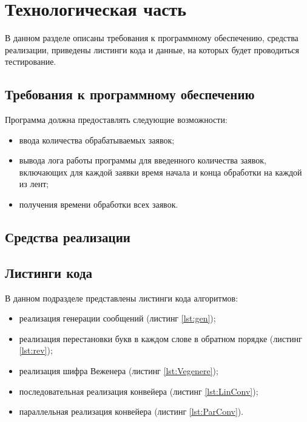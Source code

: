 \chapter{Технологическая часть}

В данном разделе описаны требования к программному обеспечению, средства
реализации, приведены листинги кода и данные, на которых будет проводиться
тестирование.

\section{Требования к программному обеспечению}

Программа должна предоставлять следующие возможности:
\begin{itemize}[left=\parindent]
    \item ввода количества обрабатываемых заявок;
    \item вывода лога работы программы для введенного количества заявок,
        включающих для каждой заявки время начала и конца обработки на каждой
        из лент;
    \item получения времени обработки всех заявок.
\end{itemize}

\section{Средства реализации}


\newpage
\section{Листинги кода}

В данном подразделе представлены листинги кода алгоритмов:
\begin{itemize}[]
    \item реализация генерации сообщений (листинг \ref{lst:gen});
    \item реализация перестановки букв в каждом слове в обратном
          порядке (листинг \ref{lst:rev});
    \item реализация шифра Веженера (листинг \ref{lst:Vegenere});
    \item последовательная реализация конвейера (листинг \ref{lst:LinConv});
    \item параллельная реализация конвейера (листинг \ref{lst:ParConv}).
\end{itemize}

